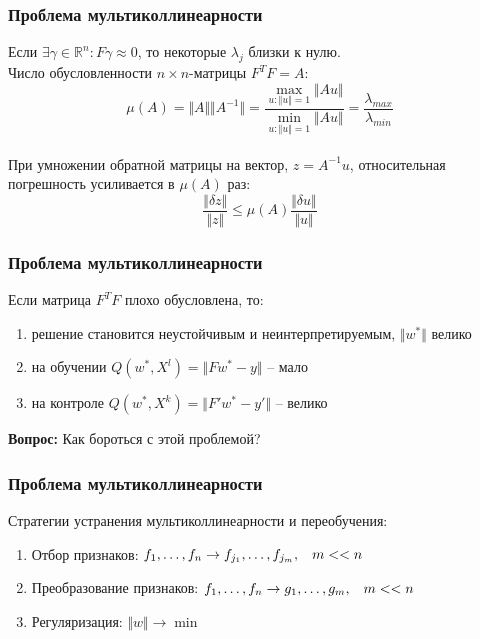 \documentclass[12pt]{beamer}
\begin{document}
\begin{frame}\frametitle{Проблема мультиколлинеарности}
Если $\exists \gamma \in \mathbb{R}^n: F\gamma \approx 0$, то некоторые $\lambda_j$ близки к нулю.\\
Число обусловленности $n \times n$-матрицы $F^TF = A$:
$$\mu(A) = \Vert A \Vert \Vert A^{-1} \Vert = \frac{\max\limits_{u: \Vert u \Vert = 1} \Vert A u \Vert}{\min\limits_{u: \Vert u \Vert = 1} \Vert A u \Vert} = \frac{\lambda_{max}}{\lambda_{min}}$$\\
При умножении обратной матрицы на вектор, $z = A^{-1}u$, относительная погрешность усиливается в $\mu(A)$ раз:\\
$$\frac{\Vert \delta z \Vert}{\Vert z \Vert } \leq \mu(A) \frac{\Vert \delta u \Vert}{\Vert u \Vert }$$
\end{frame}

\begin{frame}\frametitle{Проблема мультиколлинеарности}
Если матрица $F^TF$ плохо обусловлена, то: 
\begin{enumerate}[--]
\item решение становится неустойчивым и неинтерпретируемым, $\Vert w^* \Vert $ велико
\item на обучении $Q(w^*, X^l) = \Vert Fw^* -y \Vert$ -- мало   
\item на контроле $Q(w^*, X^k) = \Vert F'w^* -y' \Vert$ -- велико
\end{enumerate}
\textbf{Вопрос:} Как бороться с этой проблемой?
\end{frame}

\begin{frame}\frametitle{Проблема мультиколлинеарности}
Стратегии устранения мультиколлинеарности и переобучения:
\begin{enumerate}[--]
\item Отбор признаков: $f_1, \dots, f_n \rightarrow f_{j_1}, \dots, f_{j_m}, \hspace{3mm} m << n$
\item Преобразование признаков: $f_1, \dots, f_n \rightarrow g_1, \dots, g_m,\hspace{3mm}  m << n$
\item Регуляризация: $\Vert w \Vert \rightarrow \min$
\end{enumerate}
\end{frame}
\end{document}
